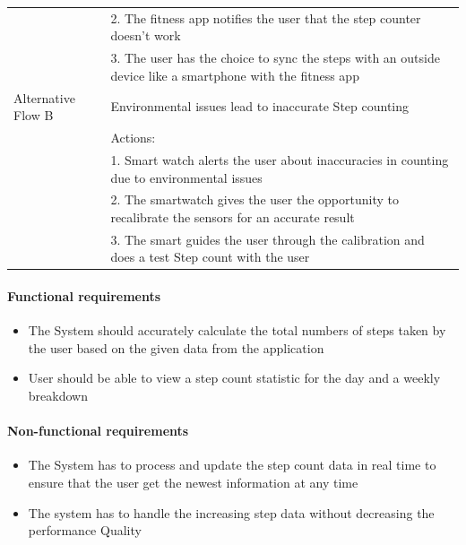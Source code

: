 \documentclass{article}
\begin{document}
\begin{table}[h]
\begin{tabularx}{\textwidth}{|>{\raggedright\arraybackslash}p{}|X|}
								 & 2. The fitness app notifies the user that the step counter doesn't work \\
								 & 3. The user has the choice to sync the steps with an outside device like a smartphone with the fitness app\\ \hline
				Alternative Flow B & Environmental issues lead to inaccurate Step counting \\
								 & Actions: \\
								 & 1. Smart watch alerts the user about inaccuracies in counting due to environmental issues \\
								 & 2. The smartwatch gives the user the opportunity to recalibrate the sensors for an accurate result \\
								 & 3. The smart guides the user through the calibration and does a test Step count with the user \\ \hline
			\end{tabularx}
		\end{table}
		\paragraph{Functional requirements}
		\begin{itemize}
			\item The System should accurately calculate the total numbers of steps taken by the user based on the given data from the application
			\item User should be able to view a step count statistic for the day and a weekly breakdown		
		\end{itemize}
		
		\paragraph{Non-functional requirements}
		\begin{itemize}
			\item The System has to process and update the step count data in real time to ensure that the user get the newest information at any time
			\item The system has to handle the increasing step data without decreasing the
performance Quality
		\end{itemize}
\end{document}
